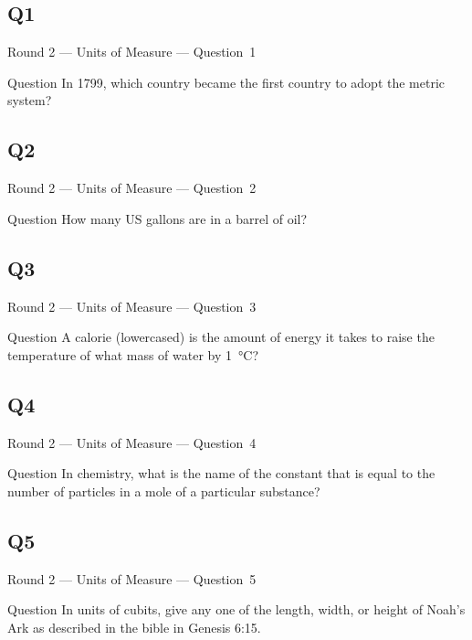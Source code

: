 \documentclass[11pt]{beamer}
\begin{document}
\subsection*{Q1}
\begin{frame}[t]{Round 2 --- Units of Measure --- \mbox{Question 1}}
\vspace{-0.5em}
\begin{block}{Question}
In 1799, which country became the first country to adopt the metric system?
\end{block}
\end{frame}
\subsection*{Q2}
\begin{frame}[t]{Round 2 --- Units of Measure --- \mbox{Question 2}}
\vspace{-0.5em}
\begin{block}{Question}
How many US gallons are in a barrel of oil?
\end{block}
\end{frame}
\subsection*{Q3}
\begin{frame}[t]{Round 2 --- Units of Measure --- \mbox{Question 3}}
\vspace{-0.5em}
\begin{block}{Question}
A calorie (lowercased) is the amount of energy it takes to raise the temperature of what mass of water by \SI{1}{\celsius}?
\end{block}
\end{frame}
\subsection*{Q4}
\begin{frame}[t]{Round 2 --- Units of Measure --- \mbox{Question 4}}
\vspace{-0.5em}
\begin{block}{Question}
In chemistry, what is the name of the constant that is equal to the number of particles in a mole of a particular substance?
\end{block}
\end{frame}
\subsection*{Q5}
\begin{frame}[t]{Round 2 --- Units of Measure --- \mbox{Question 5}}
\vspace{-0.5em}
\begin{block}{Question}
In units of cubits, give any one of the length, width, or height of Noah's Ark as described in the bible in Genesis 6:15.
\end{block}
\end{frame}
\end{document}
